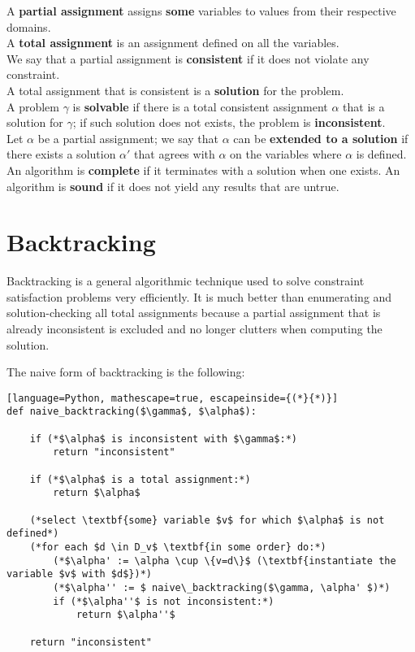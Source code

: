 \documentclass{article}
\begin{document}
A \textbf{partial assignment} assigns \textbf{some} variables to values from their respective domains. \\
A \textbf{total assignment} is an assignment defined on all the variables. \\
We say that a partial assignment is \textbf{consistent} if it does not violate any constraint.\\
A total assignment that is consistent is a \textbf{solution} for the problem.\\
A problem $\gamma$ is \textbf{solvable} if there is a total consistent assignment $\alpha$ that is a solution for $\gamma$; if such solution does not exists, the problem is \textbf{inconsistent}.\\
Let $\alpha$ be a partial assignment; we say that $\alpha$ can be \textbf{extended to a solution} if there exists a solution $\alpha'$ that agrees with $\alpha$ on the variables where $\alpha$ is defined. \\

An algorithm is \textbf{complete} if it terminates with a solution when one exists.
An algorithm is \textbf{sound} if it does not yield any results that are untrue.

\section{Backtracking}

Backtracking is a general algorithmic technique used to solve constraint satisfaction problems very efficiently. It is much better than enumerating and solution-checking all total assignments because a partial assignment that is already inconsistent is excluded and no longer clutters when computing the solution. \\

\begin{flushleft}
    The naive form of backtracking is the following:
\end{flushleft}

\begin{lstlisting}[language=Python, mathescape=true, escapeinside={(*}{*)}]
def naive_backtracking($\gamma$, $\alpha$):

    if (*$\alpha$ is inconsistent with $\gamma$:*)
        return "inconsistent"

    if (*$\alpha$ is a total assignment:*)
        return $\alpha$

    (*select \textbf{some} variable $v$ for which $\alpha$ is not defined*)
    (*for each $d \in D_v$ \textbf{in some order} do:*)
        (*$\alpha' := \alpha \cup \{v=d\}$ (\textbf{instantiate the variable $v$ with $d$})*)
        (*$\alpha'' := $ naive\_backtracking($\gamma, \alpha' $)*)
        if (*$\alpha''$ is not inconsistent:*)
            return $\alpha''$

    return "inconsistent"
    
\end{lstlisting}
\end{document}
